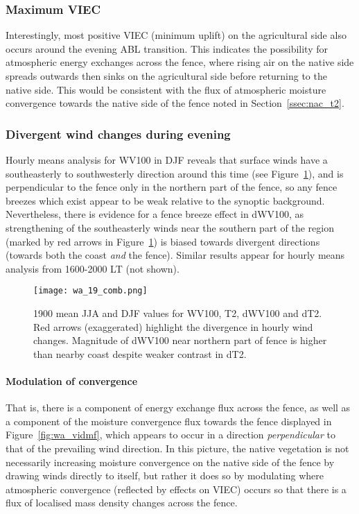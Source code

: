 \subsubsection{Maximum VIEC}

Interestingly, most positive \ac{VIEC} (minimum uplift) on the agricultural side also occurs around the evening \ac{ABL} transition. This indicates the possibility for atmospheric energy exchanges across the fence, where rising air on the native side spreads outwards then sinks on the agricultural side before returning to the native side. This would be consistent with the flux of atmospheric moisture convergence towards the native side of the fence noted in Section~\ref{ssec:nac_t2}.

\subsubsection{Divergent wind changes during evening}

Hourly means analysis for \ac{WV100} in \ac{DJF} reveals that surface winds have a southeasterly to southwesterly direction around this time (see Figure~\ref{fig:wa_19_comb}), and is perpendicular to the fence only in the northern part of the fence, so any fence breezes which exist appear to be weak relative to the synoptic background. Nevertheless, there is evidence for a fence breeze effect in \ac{dWV100}, as strengthening of the southeasterly winds near the southern part of the region (marked by red arrows in Figure~\ref{fig:wa_19_comb}) is biased towards divergent directions (towards both the coast \textit{and} the fence). Similar results appear for hourly means analysis from 1600-2000 \ac{LT} (not shown).

\begin{figure}[!htp]
	\centering
	\texttt{[image: wa\_19\_comb.png]}
	\caption[Divergent wind changes during evening]{1900 mean \ac{JJA} and \ac{DJF} values for \acs{WV100}, \acs{T2}, \acs{dWV100} and \acs{dT2}. Red arrows (exaggerated) highlight the divergence in hourly wind changes. Magnitude of \ac{dWV100} near northern part of fence is higher than nearby coast despite weaker contrast in \ac{dT2}.}
	\label{fig:wa_19_comb}
\end{figure}

\paragraph{Modulation of convergence}

That is, there is a component of energy exchange flux across the fence, as well as a component of the moisture convergence flux towards the fence displayed in Figure~\ref{fig:wa_vidmf}, which appears to occur in a direction \textit{perpendicular} to that of the prevailing wind direction. In this picture, the native vegetation is not necessarily increasing moisture convergence on the native side of the fence by drawing winds directly to itself, but rather it does so by modulating where atmospheric convergence (reflected by effects on \ac{VIEC}) occurs so that there is a flux of localised mass density changes across the fence.

